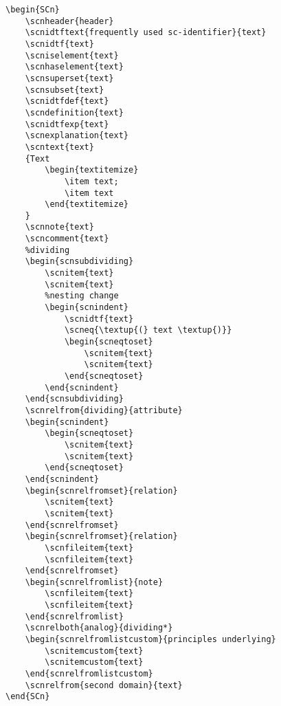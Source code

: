 \begin{lstlisting}              
\begin{SCn}
	\scnheader{header}
	\scnidtftext{frequently used sc-identifier}{text}
	\scnidtf{text}
	\scniselement{text}
	\scnhaselement{text}
	\scnsuperset{text}
	\scnsubset{text}
	\scnidtfdef{text}
	\scndefinition{text}
	\scnidtfexp{text}
	\scnexplanation{text}
	\scntext{text}
	{Text
		\begin{textitemize}
			\item text;
			\item text
		\end{textitemize}
	}
	\scnnote{text}
	\scncomment{text}
	%dividing
	\begin{scnsubdividing}
		\scnitem{text}
		\scnitem{text}
		%nesting change
		\begin{scnindent}
			\scnidtf{text}
			\scneq{\textup{(} text \textup{)}}
			\begin{scneqtoset}
				\scnitem{text}
				\scnitem{text}
			\end{scneqtoset}
		\end{scnindent} 
	\end{scnsubdividing}
	\scnrelfrom{dividing}{attribute}
	\begin{scnindent}
		\begin{scneqtoset}
			\scnitem{text}
			\scnitem{text}
		\end{scneqtoset}
	\end{scnindent} 
	\begin{scnrelfromset}{relation}
		\scnitem{text}
		\scnitem{text}
	\end{scnrelfromset}
	\begin{scnrelfromset}{relation}
		\scnfileitem{text}
		\scnfileitem{text}
	\end{scnrelfromset}
	\begin{scnrelfromlist}{note}
		\scnfileitem{text}
		\scnfileitem{text}
	\end{scnrelfromlist}
	\scnrelboth{analog}{dividing*}
	\begin{scnrelfromlistcustom}{principles underlying}
		\scnitemcustom{text}
		\scnitemcustom{text}
	\end{scnrelfromlistcustom}
	\scnrelfrom{second domain}{text}
\end{SCn}
\end{lstlisting} 

